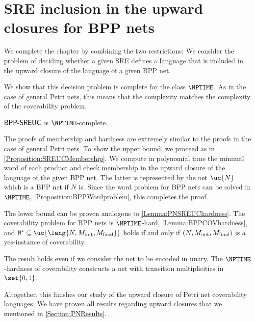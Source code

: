 \documentclass[../../diss.tex]{subfiles}
\begin{document}
\section{SRE inclusion in the upward closures for BPP nets}%
\label{Section:BPPSREUC}%

We complete the chapter by combining the two restrictions:
We consider the problem of deciding whether a given SRE defines a language that is included in the upward closure of the language of a given BPP net.

\begin{problem}
    \problemshort{($\SREBPPUC$)}
\end{problem}

We show that this decision problem is complete for the class $\NPTIME$.
As in the case of general Petri nets, this means that the complexity matches the complexity of the coverability problem.

\begin{theorem}%
\label{Theorem:BPPSREUC}%
    $\SREBPPUC$ is $\NPTIME$-complete.
\end{theorem}

The proofs of membership and hardness are extremely similar to the proofs in the case of general Petri nets.
To show the upper bound, we proceed as in \cref{Proposition:SREUCMembership}.
We compute in polynomial time the minimal word of each product and check membership in the upward closure of the language of the given BPP net.
The latter is represented by the net $\uc{N}$ which is a BPP net if $N$ is.
Since the word problem for BPP nets can be solved in $\NPTIME$, \cref{Proposition:BPPWordproblem}, this completes the proof.

The lower bound can be proven analogous to \cref{Lemma:PNSREUChardness}.
The coverability problem for BPP nets is $\NPTIME$-hard, \cref{Lemma:BPPCOVhardness}, and $\emptyset^* \subseteq \uc{\lang{N,\Minit,\Mfinal}}$ holds if and only if $(N,M_{\text{init}},M_{\text{final}})$ is a yes-instance of coverability.

The result holds even if we consider the net to be encoded in unary.
The $\NPTIME$-hardness of coverability constructs a net with transition multiplicities in $\set{0,1}$.

Altogether, this finishes our study of the upward closure of Petri net coverability languages.
We have proven all results regarding upward closures that we mentioned in \cref{Section:PNResults}.
\end{document}
